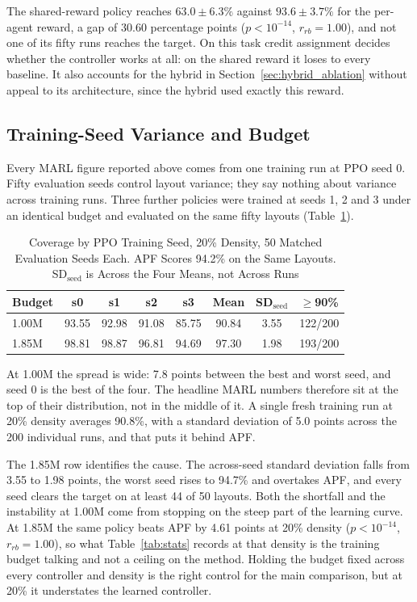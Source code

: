 \documentclass[a4paper, 10pt, conference]{ieeeconf}
\begin{document}
The shared-reward policy reaches $63.0\pm6.3\%$ against $93.6\pm3.7\%$
for the per-agent reward, a gap of $30.60$ percentage points
($p<10^{-14}$, $r_{rb}=1.00$), and not one of its fifty runs reaches
the target. On this task credit assignment decides whether the
controller works at all: on the shared reward it loses to every
baseline. It also accounts for the hybrid in
Section~\ref{sec:hybrid_ablation} without appeal to its architecture,
since the hybrid used exactly this reward.

\subsection{Training-Seed Variance and Budget}\label{sec:seedvar}

Every MARL figure reported above comes from one training run at PPO
seed 0. Fifty evaluation seeds control layout variance; they say
nothing about variance across training runs. Three further policies
were trained at seeds 1, 2 and 3 under an identical budget and
evaluated on the same fifty layouts (Table~\ref{tab:seedvar}).

\begin{table}[htb]
\centering
\caption{Coverage by PPO Training Seed, 20\% Density, 50 Matched
Evaluation Seeds Each. APF Scores 94.2\% on the Same Layouts.
SD$_{\text{seed}}$ is Across the Four Means, not Across Runs}
\label{tab:seedvar}
\scriptsize
\setlength{\tabcolsep}{2pt}
\begin{tabular}{lccccccc}
\toprule
\textbf{Budget} & \textbf{s0} & \textbf{s1} & \textbf{s2} &
\textbf{s3} & \textbf{Mean} & \textbf{SD$_{\text{seed}}$} &
\textbf{$\geq$90\%} \\
\midrule
1.00M & 93.55 & 92.98 & 91.08 & 85.75 & 90.84 & 3.55 & 122/200 \\
1.85M & 98.81 & 98.87 & 96.81 & 94.69 & 97.30 & 1.98 & 193/200 \\
\bottomrule
\end{tabular}
\end{table}

At 1.00M the spread is wide: 7.8 points between the best and worst
seed, and seed 0 is the best of the four. The headline MARL numbers
therefore sit at the top of their distribution, not in the middle of
it. A single fresh training run at 20\% density averages 90.8\%, with
a standard deviation of 5.0 points across the 200 individual runs, and
that puts it behind APF.

The 1.85M row identifies the cause. The across-seed standard deviation
falls from 3.55 to 1.98 points, the worst seed rises to 94.7\% and
overtakes APF, and every seed clears the target on at least 44 of 50
layouts. Both the shortfall and the instability at 1.00M come from
stopping on the steep part of the learning curve. At 1.85M the same
policy beats APF by 4.61 points at 20\% density ($p<10^{-14}$,
$r_{rb}=1.00$), so what Table~\ref{tab:stats} records at that density
is the training budget talking and not a ceiling on the method.
Holding the budget fixed across every controller and density is the
right control for the main comparison, but at 20\% it understates the
learned controller.
\end{document}
